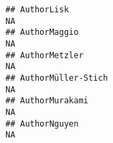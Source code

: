 \documentclass[]{article}
\begin{document}
\begin{verbatim}
## AuthorLisk                                                                                                                                                                                                                                                                                                                                                                                                                                                                            NA
## AuthorMaggio                                                                                                                                                                                                                                                                                                                                                                                                                                                                          NA
## AuthorMetzler                                                                                                                                                                                                                                                                                                                                                                                                                                                                         NA
## AuthorMüller-Stich                                                                                                                                                                                                                                                                                                                                                                                                                                                                    NA
## AuthorMurakami                                                                                                                                                                                                                                                                                                                                                                                                                                                                        NA
## AuthorNguyen                                                                                                                                                                                                                                                                                                                                                                                                                                                                          NA

\end{verbatim}
\end{document}
